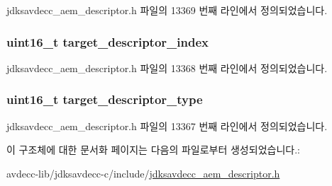 jdksavdecc\+\_\+aem\+\_\+descriptor.\+h 파일의 13369 번째 라인에서 정의되었습니다.

\subsubsection[{\texorpdfstring{target\+\_\+descriptor\+\_\+index}{target_descriptor_index}}]{\setlength{\rightskip}{0pt plus 5cm}uint16\+\_\+t target\+\_\+descriptor\+\_\+index}\hypertarget{structjdksavdecc__descriptor__memory__object_a25114746ea494f3fcb88975177992d78}{}\label{structjdksavdecc__descriptor__memory__object_a25114746ea494f3fcb88975177992d78}


jdksavdecc\+\_\+aem\+\_\+descriptor.\+h 파일의 13368 번째 라인에서 정의되었습니다.

\subsubsection[{\texorpdfstring{target\+\_\+descriptor\+\_\+type}{target_descriptor_type}}]{\setlength{\rightskip}{0pt plus 5cm}uint16\+\_\+t target\+\_\+descriptor\+\_\+type}\hypertarget{structjdksavdecc__descriptor__memory__object_a37cbc6edcac0d8d8c2006c0d6f3c00af}{}\label{structjdksavdecc__descriptor__memory__object_a37cbc6edcac0d8d8c2006c0d6f3c00af}


jdksavdecc\+\_\+aem\+\_\+descriptor.\+h 파일의 13367 번째 라인에서 정의되었습니다.



이 구조체에 대한 문서화 페이지는 다음의 파일로부터 생성되었습니다.\+:\begin{DoxyCompactItemize}
\item 
avdecc-\/lib/jdksavdecc-\/c/include/\hyperlink{jdksavdecc__aem__descriptor_8h}{jdksavdecc\+\_\+aem\+\_\+descriptor.\+h}\end{DoxyCompactItemize}
